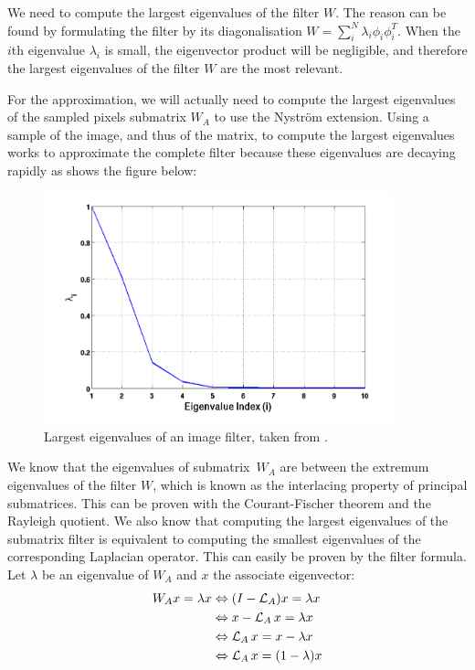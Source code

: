 We need to compute the largest eigenvalues of the filter \(W\).
The reason can be found by formulating the filter by its diagonalisation \(W = \sum_i^N \lambda_i \phi_i \phi_i^T\).
When the \(i\)th eigenvalue \(\lambda_i\) is small, the eigenvector product will be negligible, and therefore the largest eigenvalues of the filter \(W\) are the most relevant.

For the approximation, we will actually need to compute the largest eigenvalues of the sampled pixels submatrix \(W_A\) to use the Nystr\"om extension.
Using a sample of the image, and thus of the matrix, to compute the largest eigenvalues works to approximate the complete filter because these eigenvalues are decaying rapidly as shows the figure below:
\begin{figure}[H]
  \centering
  \includegraphics[width=0.9\textwidth]{img/decayingEigenvalues.png}
  \caption{Largest eigenvalues of an image filter, taken from \cite{siam_slides_2016}.}
\end{figure}

We know that the eigenvalues of submatrix\ \(W_A\) are between the extremum eigenvalues of the filter \(W\), which is known as the interlacing property of principal submatrices.
This can be proven with the Courant-Fischer theorem and the Rayleigh quotient.
We also know that computing the largest eigenvalues of the submatrix filter is equivalent to computing the smallest eigenvalues of the corresponding Laplacian operator.
This can easily be proven by the filter formula.
Let \(\lambda\) be an eigenvalue of \(W_A\) and \(x\) the associate eigenvector:
\begin{equation}
 \begin{split}
     W_A x = \lambda x & \Leftrightarrow (I - \operatorname{\mathcal{L}}_A)x = \lambda x \\
                     & \Leftrightarrow x - \operatorname{\mathcal{L}}_A x = \lambda x \\
                     & \Leftrightarrow \operatorname{\mathcal{L}}_A x = x - \lambda x \\
                     & \Leftrightarrow \operatorname{\mathcal{L}}_A x = (1 - \lambda) x
 \end{split}
\end{equation}

